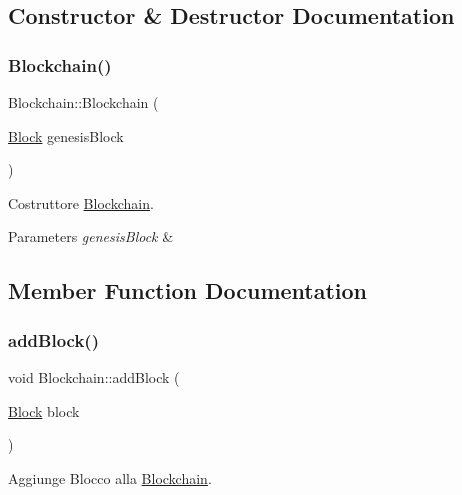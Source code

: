 \subsection{Constructor \& Destructor Documentation}
\mbox{\label{class_blockchain_a5b9d680a89243c663391801caec5d961}} 
\subsubsection{\texorpdfstring{Blockchain()}{Blockchain()}}
{\footnotesize\ttfamily Blockchain\+::\+Blockchain (\begin{DoxyParamCaption}\item[{\mbox{\hyperlink{class_block}{Block}}}]{genesis\+Block }\end{DoxyParamCaption})}



Costruttore \mbox{\hyperlink{class_blockchain}{Blockchain}}. 


\begin{DoxyParams}{Parameters}
{\em genesis\+Block} & \\
\hline
\end{DoxyParams}


\subsection{Member Function Documentation}
\mbox{\label{class_blockchain_ace37b5ceb8fecfbcca98203a50f7cc7b}} 
\subsubsection{\texorpdfstring{add\+Block()}{addBlock()}}
{\footnotesize\ttfamily void Blockchain\+::add\+Block (\begin{DoxyParamCaption}\item[{\mbox{\hyperlink{class_block}{Block}}}]{block }\end{DoxyParamCaption})\hspace{0.3cm}{\ttfamily [virtual]}}



Aggiunge Blocco alla \mbox{\hyperlink{class_blockchain}{Blockchain}}. 



